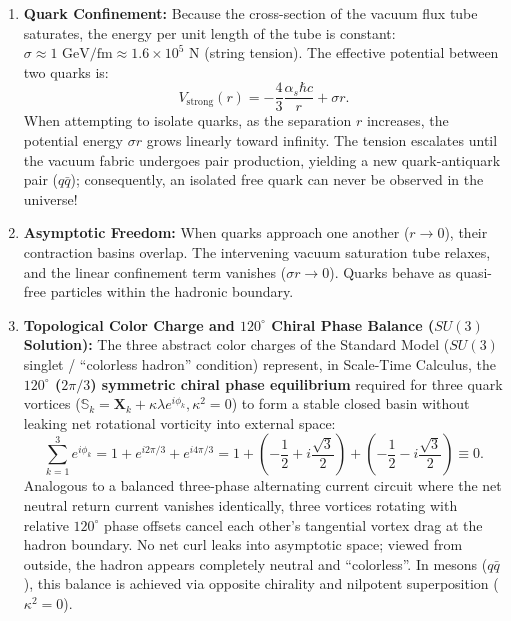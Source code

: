 \begin{enumerate}
    \item \textbf{Quark Confinement:}
          Because the cross-section of the vacuum flux tube saturates, the energy per unit length of the tube is constant: $\sigma \approx 1\text{ GeV/fm} \approx 1.6 \times 10^5\text{ N}$ (string tension). The effective potential between two quarks is:
          \begin{equation}
              V_{\mathrm{strong}}(r) = -\frac{4}{3}\frac{\alpha_s \hbar c}{r} + \sigma r.
              \label{eq:guclu_potansiyel}
          \end{equation}
          When attempting to isolate quarks, as the separation $r$ increases, the potential energy $\sigma r$ grows linearly toward infinity. The tension escalates until the vacuum fabric undergoes pair production, yielding a new quark-antiquark pair ($q\bar{q}$); consequently, an isolated free quark can never be observed in the universe!

    \item \textbf{Asymptotic Freedom:}
          When quarks approach one another ($r \to 0$), their contraction basins overlap. The intervening vacuum saturation tube relaxes, and the linear confinement term vanishes ($\sigma r \to 0$). Quarks behave as quasi-free particles within the hadronic boundary.

    \item \textbf{Topological Color Charge and $120^\circ$ Chiral Phase Balance ($SU(3)$ Solution):}
          The three abstract color charges of the Standard Model ($SU(3)$ singlet / ``colorless hadron'' condition) represent, in Scale-Time Calculus, the \textbf{$120^\circ$ ($2\pi/3$) symmetric chiral phase equilibrium} required for three quark vortices ($\mathbb{S}_k = \mathbf{X}_k + \kappa \lambda e^{i \phi_k}, \kappa^2 = 0$) to form a stable closed basin without leaking net rotational vorticity into external space:
          \begin{equation}
              \sum_{k=1}^3 e^{i \phi_k} = 1 + e^{i 2\pi/3} + e^{i 4\pi/3} = 1 + \left( -\frac{1}{2} + i\frac{\sqrt{3}}{2} \right) + \left( -\frac{1}{2} - i\frac{\sqrt{3}}{2} \right) \equiv 0.
              \label{eq:renk_faz_toplami_main}
          \end{equation}
          Analogous to a balanced three-phase alternating current circuit where the net neutral return current vanishes identically, three vortices rotating with relative $120^\circ$ phase offsets cancel each other's tangential vortex drag at the hadron boundary. No net curl leaks into asymptotic space; viewed from outside, the hadron appears completely neutral and ``colorless''. In mesons ($q\bar{q}$), this balance is achieved via opposite chirality and nilpotent superposition ($\kappa^2 = 0$).
\end{enumerate}

